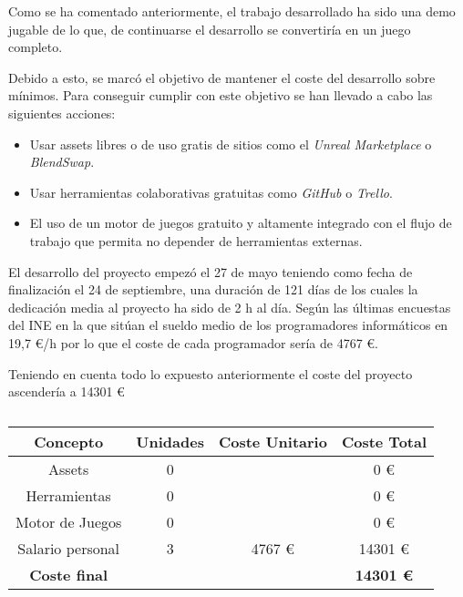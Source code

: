 Como se ha comentado anteriormente, el trabajo desarrollado ha sido una demo jugable de lo que, de continuarse el desarrollo se convertiría en un juego completo.



Debido a esto, se marcó el objetivo de mantener el coste del desarrollo sobre mínimos. Para conseguir cumplir con este objetivo se han llevado a cabo las siguientes acciones:
\begin{itemize}
	\item Usar assets libres o de uso gratis de sitios como el \textit{Unreal Marketplace} o \textit{BlendSwap}.
	\item Usar herramientas colaborativas gratuitas como \textit{GitHub} o \textit{Trello}.
	\item El uso de un motor de juegos gratuito y altamente integrado con el flujo de trabajo que permita no depender de herramientas externas.
\end{itemize}

El desarrollo del proyecto empezó el 27 de mayo teniendo como fecha de finalización el 24 de septiembre, una duración de 121 días de los cuales la dedicación media al proyecto ha sido de 2 h al día. 
Según las últimas encuestas del INE  en la que sitúan el sueldo medio de los programadores informáticos en 19,7 \euro/h por lo que el coste de cada programador sería de 4767 \euro.

Teniendo en cuenta todo lo expuesto anteriormente el coste del proyecto ascendería a 14301 \euro

\begin{table}[!h]
\centering
\begin{tabular}{cccc}
\hline
\textbf{Concepto} & \textbf{Unidades} & \textbf{Coste Unitario} & \textbf{Coste Total} \\ \hline
Assets            & 0                 &                         & 0 \euro                  \\ \hline
Herramientas      & 0                 &                         & 0 \euro                  \\ \hline
Motor de Juegos   & 0                 &                         & 0 \euro                  \\ \hline
Salario personal  & 3                 & 4767 \euro                    & 14301 \euro               \\ \hline
\textbf{Coste final}       &                   &                         & \textbf{14301 \euro}               \\ \hline
\end{tabular}
\caption{}
\end{table} 